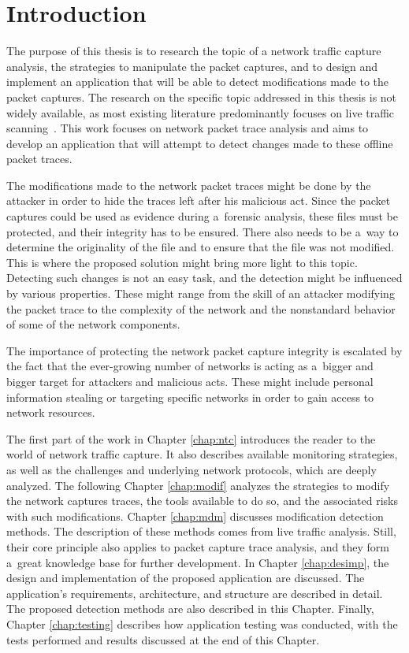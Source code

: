 \documentclass[
  printed,     %
  color,       %
  oneside,     %
  nosansbold,  %
  nocolorbold, %
  nolof,         %
  nolot,         %
]{fithesis4}
\begin{document}
\chapter{Introduction}

The purpose of this thesis is to research the topic of a network traffic capture analysis, the strategies to manipulate the packet captures, and to design and implement an application that will be able to detect modifications made to the packet captures. The research on the specific topic addressed in this thesis is not widely available, as most existing literature predominantly focuses on live traffic scanning~\cite{ABBASI202119}. This work focuses on network packet trace analysis and aims to develop an application that will attempt to detect changes made to these offline packet traces.

The modifications made to the network packet traces might be done by the attacker in order to hide the traces left after his malicious act. Since the packet captures could be used as evidence during a~forensic analysis, these files must be protected, and their integrity has to be ensured. There also needs to be a~way to determine the originality of the file and to ensure that the file was not modified. This is where the proposed solution might bring more light to this topic. Detecting such changes is not an easy task, and the detection might be influenced by various properties. These might range from the skill of an attacker modifying the packet trace to the complexity of the network and the nonstandard behavior of some of the network components.

The importance of protecting the network packet capture integrity is escalated by the fact that the ever-growing number of networks is acting as a~bigger and bigger target for attackers and malicious acts. These might include personal information stealing or targeting specific networks in order to gain access to network resources.

The first part of the work in Chapter \ref{chap:ntc} introduces the reader to the world of network traffic capture. It also describes available monitoring strategies, as well as the challenges and underlying network protocols, which are deeply analyzed. The following Chapter \ref{chap:modif} analyzes the strategies to modify the network captures traces, the tools available to do so, and the associated risks with such modifications.
Chapter \ref{chap:mdm} discusses modification detection methods. The description of these methods comes from live traffic analysis. Still, their core principle also applies to packet capture trace analysis, and they form a~great knowledge base for further development. In Chapter \ref{chap:desimp}, the design and implementation of the proposed application are discussed. The application's requirements, architecture, and structure are described in detail. The proposed detection methods are also described in this Chapter. Finally, Chapter \ref{chap:testing} describes how application testing was conducted, with the tests performed and results discussed at the end of this Chapter.
\end{document}
